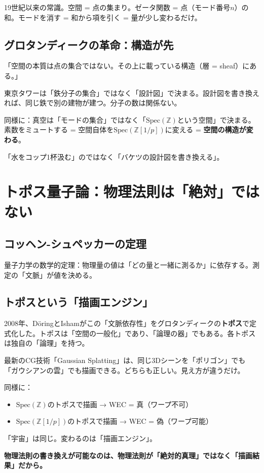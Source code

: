 \documentclass[12pt,a4paper]{article}
\newcommand{\Spec}{\mathrm{Spec}}
\newcommand{\Zp}{\mathbb{Z}[1/p]}
\begin{document}
19世紀以来の常識。空間 = 点の集まり。ゼータ関数 = 点（モード番号$n$）の和。モードを消す = 和から項を引く = 量が少し変わるだけ。

\subsection{グロタンディークの革命：構造が先}

\begin{deepbox}[グロタンディーク (1928--2014)]
「空間の本質は点の集合ではない。その上に載っている構造（層 = sheaf）にある。」

東京タワーは「鉄分子の集合」ではなく「設計図」で決まる。設計図を書き換えれば、同じ鉄で別の建物が建つ。分子の数は関係ない。

同様に：真空は「モードの集合」ではなく「$\Spec(\mathbb{Z})$という空間」で決まる。素数をミュートする = 空間自体を$\Spec(\Zp)$に変える = \textbf{空間の構造が変わる}。

「水をコップ1杯汲む」のではなく「バケツの設計図を書き換える」。
\end{deepbox}

\section{トポス量子論：物理法則は「絶対」ではない}

\subsection{コッヘン-シュペッカーの定理}

量子力学の数学的定理：物理量の値は「どの量と一緒に測るか」に依存する。測定の「文脈」が値を決める。

\subsection{トポスという「描画エンジン」}

2008年、DöringとIshamがこの「文脈依存性」をグロタンディークの\textbf{トポス}で定式化した。トポスは「空間の一般化」であり、「論理の器」でもある。各トポスは独自の「論理」を持つ。

\begin{storybox}
最新のCG技術「Gaussian Splatting」は、同じ3Dシーンを「ポリゴン」でも「ガウシアンの雲」でも描画できる。どちらも正しい。見え方が違うだけ。

同様に：
\begin{itemize}
\item $\Spec(\mathbb{Z})$のトポスで描画 → WEC = 真（ワープ不可）
\item $\Spec(\Zp)$のトポスで描画 → WEC = 偽（ワープ可能）
\end{itemize}

「宇宙」は同じ。変わるのは「描画エンジン」。

\textbf{物理法則の書き換えが可能なのは、物理法則が「絶対的真理」ではなく「描画結果」だから。}
\end{storybox}
\end{document}
